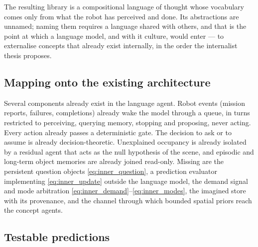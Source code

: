 The resulting library is a compositional language of thought whose vocabulary comes only from what the robot has
perceived and done. Its abstractions are unnamed; naming them requires a language shared with others, and that is
the point at which a language model, and with it culture, would enter --- to externalise concepts that already exist
internally, in the order the internalist thesis proposes.

\subsection{Mapping onto the existing architecture}
\label{sec:inner_speech:mapping}

Several components already exist in the language agent. Robot events (mission reports, failures, completions)
already wake the model through a queue, in turns restricted to perceiving, querying memory, stopping and
proposing, never acting. Every action already passes a deterministic gate. The decision to ask or to assume is
already decision-theoretic. Unexplained occupancy is already isolated by a residual agent that acts as the null
hypothesis of the scene, and episodic and long-term object memories are already joined read-only. Missing are the
persistent question objects \eqref{eq:inner_question}, a prediction evaluator implementing
\eqref{eq:inner_update} outside the language model, the demand signal and mode arbitration
\eqref{eq:inner_demand}--\eqref{eq:inner_modes}, the imagined store with its provenance, and the channel through
which bounded spatial priors reach the concept agents.

\subsection{Testable predictions}
\label{sec:inner_speech:predictions}

